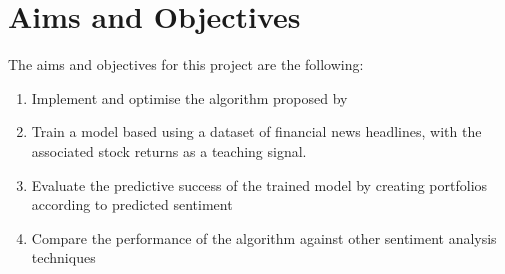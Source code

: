 \newpage

\section{Aims and Objectives}
The aims and objectives for this project are the following:
\begin{enumerate}
\item Implement and optimise the algorithm proposed by \cite{sestm}
\item Train a model based using a dataset of financial news headlines, with the associated stock returns as a teaching signal.
\item Evaluate the predictive success of the trained model by creating portfolios according to predicted sentiment
\item Compare the performance of the algorithm against other sentiment analysis techniques
\end{enumerate}



 


